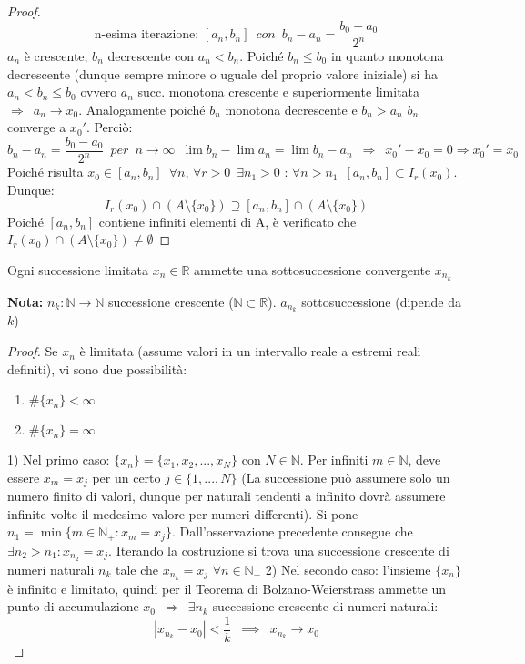 \documentclass[10pt, oneside]{book}
\theoremstyle{plain}
\begin{document}
\begin{proof}
\[\textrm{n-esima iterazione: } [a_n, b_n] \enspace con \enspace b_n - a_n = \frac{b_0 - a_0}{2^n}\]
$a_n$ è crescente, $b_n$ decrescente con $a_n < b_n$. Poiché $b_n \leq b_0$ in quanto monotona decrescente (dunque sempre minore o uguale del proprio valore iniziale) si ha $a_n < b_n \leq b_0$ ovvero $a_n$ succ. monotona crescente e superiormente limitata $\Rightarrow \enspace a_n \longrightarrow x_0$. Analogamente poiché $b_n$ monotona decrescente e $b_n > a_n$ $b_n$ converge a $x_0'$. Perciò:
\[b_n - a_n = \frac{b_0 - a_0}{2^n} \enspace per \enspace n \rightarrow \infty \enspace \lim b_n - \lim a_n = \lim b_n - a_n \enspace \Rightarrow \enspace x_0' - x_0 = 0 \Rightarrow x_0' = x_0\]
Poiché risulta $x_0 \in [a_n, b_n] \enspace \forall n$, $\forall r > 0 \enspace \exists n_1 > 0$ : $\forall n > n_1 \enspace [a_n, b_n] \subset I_r(x_0)$. Dunque:
\[I_r(x_0) \cap (A \setminus \{x_0\}) \supseteq [a_n, b_n] \cap (A \setminus \{x_0\})\]
Poiché $[a_n, b_n]$ contiene infiniti elementi di A, è verificato che $I_r(x_0) \cap (A \setminus \{x_0\}) \neq \emptyset$
\end{proof}
\hypertarget{corollaier}{
\begin{cor}
Ogni successione limitata $x_n \in \mathbb{R}$ ammette una sottosuccessione convergente $x_{n_k}$
\end{cor}}
\textbf{Nota: } $n_k : \mathbb{N} \longrightarrow \mathbb{N}$ successione crescente ($\mathbb{N} \subset \mathbb{R}$). $a_{n_k}$ sottosuccessione (dipende da $k$)
\begin{proof}
    Se $x_n$ è limitata (assume valori in un intervallo reale a estremi reali definiti), vi sono due possibilità:
    \begin{enumerate}
    \item $\#\{x_n\} < \infty$
    \item $\#\{x_n\} = \infty$
    \end{enumerate}
    1) Nel primo caso: $\{x_n\} = \{x_1, x_2, ... , x_N\}$ con $N \in \mathbb{N}$. Per infiniti $m \in \mathbb{N}$, deve essere $x_m = x_j$ per un certo $j \in \{1, ..., N\}$ (La successione può assumere solo un numero finito di valori, dunque per naturali tendenti a infinito dovrà assumere infinite volte il medesimo valore per numeri differenti). \newline Si pone $n_1 = \min \{m \in \mathbb{N}_+ : x_m = x_j\}$. Dall'osservazione precedente consegue che $\exists n_2 > n_1 : x_{n_2} = x_j$. \newline Iterando la costruzione si trova una successione crescente di numeri naturali $n_k$ tale che $x_{n_k} = x_j$ $\forall n \in \mathbb{N}_+$
    2) Nel secondo caso: l'insieme $\{x_n\}$ è infinito e limitato, quindi per il Teorema di Bolzano-Weierstrass ammette un punto di accumulazione $x_0 \enspace \Rightarrow \enspace \exists n_k$ successione crescente di numeri naturali:
    \[|x_{n_k} - x_0| < \frac{1}{k} \enspace \implies \enspace x_{n_k} \rightarrow x_0\]
\end{proof}
\end{document}
